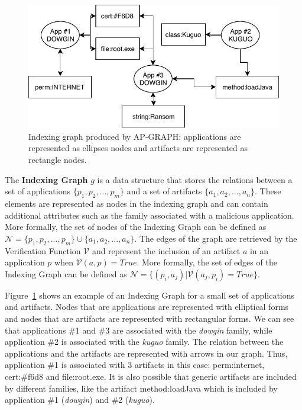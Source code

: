 \begin{figure}[!ht]
        \centering
	\includegraphics[width=0.8\linewidth]{figures/apgraph/indexes.pdf}
        \caption[Indexing graph produced by AP-GRAPH]{Indexing graph produced by AP-GRAPH: applications are represented as ellipses nodes and artifacts are represented as rectangle nodes.}
	\label{figure:apgraph:graph}
\end{figure}

The \textbf{Indexing Graph} $\mathit{g}$ is a data structure that stores the relations between a set of applications $\{\mathit{p}_1, \mathit{p}_2, ..., \mathit{p}_m\}$ and a set of artifacts $\{\mathit{a}_1, \mathit{a}_2, ..., \mathit{a}_n\}$.
These elements are represented as nodes in the indexing graph and can contain additional attributes such as the family associated with a malicious application.
More formally, the set of nodes of the Indexing Graph can be defined as $\mathcal{N}=\{\mathit{p}_1, \mathit{p}_2, ..., \mathit{p}_m\} \cup \{\mathit{a}_1, \mathit{a}_2, ..., \mathit{a}_n\}$.
The edges of the graph are retrieved by the Verification Function $\mathcal{V}$ and represent the inclusion of an artifact $\mathit{a}$ in an application $\mathit{p}$ when $\mathcal{V}(\mathit{a}, \mathit{p}) = True$.
More formally, the set of edges of the Indexing Graph can be defined as $\mathcal{N}=\{(p_i,a_j) | \mathcal{V}(\mathit{a_j}, \mathit{p_i}) = True \}$.

Figure~\ref{figure:apgraph:graph} shows an example of an Indexing Graph for a small set of applications and artifacts.
Nodes that are applications are represented with elliptical forms and nodes that are artifacts are represented with rectangular forms.
We can see that applications \#1 and \#3 are associated with the \textit{dowgin} family, while application \#2 is associated with the \textit{kuguo} family.
The relation between the applications and the artifacts are represented with arrows in our graph.
Thus, application \#1 is associated with 3 artifacts in this case: perm:internet, cert:\#f6d8 and file:root.exe.
It is also possible that generic artifacts are included by different families, like the artifact method:loadJava which is included by application \#1 (\textit{dowgin}) and \#2 (\textit{kuguo}).
